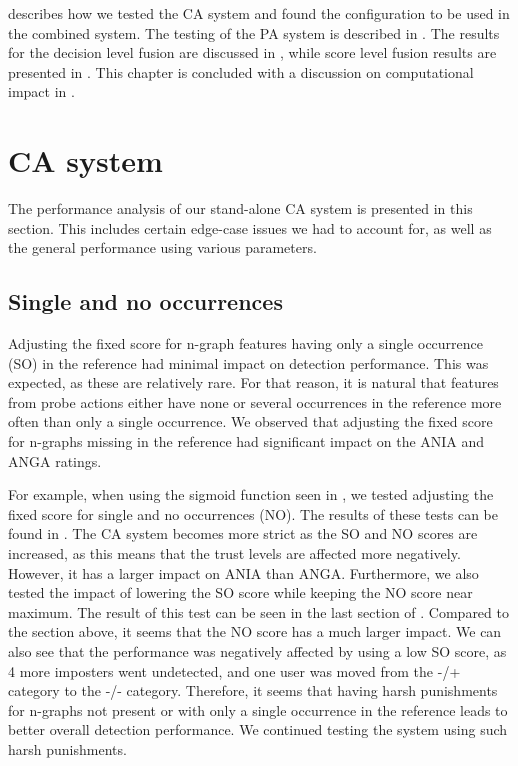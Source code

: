  describes how we tested the CA system and found the configuration to be used in the combined system. 
The testing of the PA system is described in .
The results for the decision level fusion are discussed in , while score level fusion results are presented in .
This chapter is concluded with a discussion on computational impact in .


\section{CA system}
\label{sec:analysis-CA}
The performance analysis of our stand-alone CA system is presented in this section.
This includes certain edge-case issues we had to account for, as well as the general performance using various parameters.

\subsection{Single and no occurrences}
\label{sec:analysis-CA-SONO}
Adjusting the fixed score for n-graph features having only a single occurrence (SO) in the reference had minimal impact on detection performance.
This was expected, as these are relatively rare.
For that reason, it is natural that features from probe actions either have none or several occurrences in the reference more often than only a single occurrence.
We observed that adjusting the fixed score for n-graphs missing in the reference had significant impact on the ANIA and ANGA ratings.

For example, when using the sigmoid function seen in , we tested adjusting the fixed score for single and no occurrences (NO).
The results of these tests can be found in .
The CA system becomes more strict as the SO and NO scores are increased, as this means that the trust levels are affected more negatively.
However, it has a larger impact on ANIA than ANGA.
Furthermore, we also tested the impact of lowering the SO score while keeping the NO score near maximum.
The result of this test can be seen in the last section of .
Compared to the section above, it seems that the NO score has a much larger impact.
We can also see that the performance was negatively affected by using a low SO score, as 4 more imposters went undetected, and one user was moved from the -/+ category to the -/- category.
Therefore, it seems that having harsh punishments for n-graphs not present or with only a single occurrence in the reference leads to better overall detection performance.
We continued testing the system using such harsh punishments.

